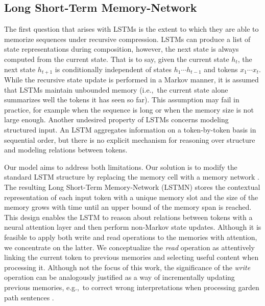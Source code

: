\documentclass[11pt,letterpaper]{article}
\begin{document}
	 
	\subsection{Long Short-Term Memory-Network}
	\label{sec:long-short-term}
	The first question that arises with LSTMs is the extent to
        which they are able to memorize sequences under recursive
        compression.  LSTMs can produce a list of state
        representations during composition, however, the next state is
        always computed from the current state. That is to say, given
        the current state $h_{t}$, the next state $h_{t+1}$ is
        conditionally independent of states $h_{1}\cdots h_{t-1}$ and
        tokens $x_{1} \cdots x_{t}$.  While the recursive state update
        is performed in a Markov manner, it is assumed that LSTMs
        maintain unbounded memory (i.e.,~the current state alone
        summarizes well the tokens it has seen so far).  This
        assumption may fail in practice, for example when the sequence is
        long or when the memory size is not large enough.  Another
        undesired property of LSTMs concerns modeling structured
        input. An LSTM aggregates information on a token-by-token
        basis in sequential order, but there is no explicit mechanism for
        reasoning over structure and modeling relations between
        tokens.




        Our model aims to address both limitations. Our solution is to
        modify the standard LSTM structure by replacing the memory
        cell with a memory network \cite{weston2014memory}.  The
        resulting Long Short-Term Memory-Network (LSTMN) stores the
        contextual representation of each input token with a unique
        memory slot and the size of the memory grows with time until
        an upper bound of the memory span is reached.  This design
        enables the LSTM to reason about relations between tokens with
        a neural attention layer and then perform non-Markov state
        updates.  Although it is feasible to apply both write and read
        operations to the memories with attention, we concentrate on
        the latter. We conceptualize the \emph{read} operation as
        attentively linking the current token to previous memories and
        selecting useful content when processing it. Although not the
        focus of this work, the significance of the \emph{write}
        operation can be analogously justified as a way of
        incrementally updating previous memories, e.g.,~to correct
        wrong interpretations when processing garden path sentences
        \cite{Ferreira:Henderson:1991}.
\end{document}
